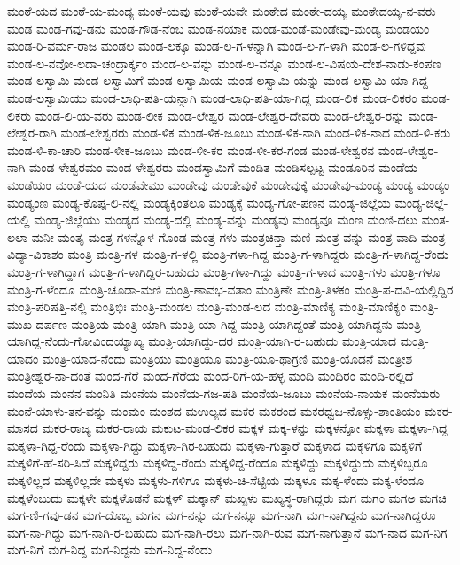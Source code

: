 ಮಂಠೆ-ಯದ
ಮಂಠೆ-ಯ-ಮಂಡ್ಯ
ಮಂಠೆ-ಯವು
ಮಂಠೆ-ಯವೇ
ಮಂಠೇದ
ಮಂಠೇ-ದಯ್ಯ
ಮಂಠೇದಯ್ಯ-ನ-ವರು
ಮಂಡ
ಮಂಡ-ಗವು-ಡನು
ಮಂಡ-ಗೌಡ-ನೆಂಬ
ಮಂಡ-ನಯಾಕ
ಮಂಡ-ಮಂಡೆ-ಮಂಡೇವು-ಮಂಡ್ಯ
ಮಂಡಯಂ
ಮಂಡ-ರಿ-ವರ್ಮ-ರಾಜ
ಮಂಡಲ
ಮಂಡ-ಲಕ್ಕೂ
ಮಂಡ-ಲ-ಗ-ಳನ್ನಾಗಿ
ಮಂಡ-ಲ-ಗ-ಳಾಗಿ
ಮಂಡ-ಲ-ಗಳಿದ್ದವು
ಮಂಡ-ಲ-ನವೋ-ಲದಾ-ಚಂದ್ರಾರ್ಕ್ಕಂ
ಮಂಡ-ಲ-ವನ್ನು
ಮಂಡ-ಲ-ವನ್ನೂ
ಮಂಡ-ಲ-ವಿಷಯ-ದೇಶ-ನಾಡು-ಕಂಪಣ
ಮಂಡ-ಲಸ್ವಾಮಿ
ಮಂಡ-ಲಸ್ವಾಮಿಗೆ
ಮಂಡ-ಲಸ್ವಾಮಿಯ
ಮಂಡ-ಲಸ್ವಾಮಿ-ಯನ್ನು
ಮಂಡ-ಲಸ್ವಾಮಿ-ಯಾ-ಗಿದ್ದ
ಮಂಡ-ಲಸ್ವಾಮಿಯು
ಮಂಡ-ಲಾಧಿ-ಪತಿ-ಯನ್ನಾಗಿ
ಮಂಡ-ಲಾಧಿ-ಪತಿ-ಯಾ-ಗಿದ್ದ
ಮಂಡ-ಲಿಕ
ಮಂಡ-ಲಿಕರಂ
ಮಂಡ-ಲಿಕರು
ಮಂಡ-ಲಿ-ಯ-ವರು
ಮಂಡ-ಲೀಕ
ಮಂಡ-ಲೇಶ್ವರ
ಮಂಡ-ಲೇಶ್ವರ-ದೇವರು
ಮಂಡ-ಲೇಶ್ವರ-ರನ್ನು
ಮಂಡ-ಲೇಶ್ವರ-ರಾಗಿ
ಮಂಡ-ಲೇಶ್ವರರು
ಮಂಡ-ಳಿಕ
ಮಂಡ-ಳಿಕ-ಜೂಬು
ಮಂಡ-ಳಿಕ-ನಾಗಿ
ಮಂಡ-ಳಿಕ-ನಾದ
ಮಂಡ-ಳಿ-ಕರು
ಮಂಡ-ಳಿ-ಕಾ-ಚಾರಿ
ಮಂಡ-ಳೀಕ-ಜೂಬು
ಮಂಡ-ಳೀ-ಕರ
ಮಂಡ-ಳೀ-ಕರ-ಗಂಡ
ಮಂಡ-ಳೇಶ್ವರನ
ಮಂಡ-ಳೇಶ್ವರ-ನಾಗಿ
ಮಂಡ-ಳೇಶ್ವರಮಂ
ಮಂಡ-ಳೇಶ್ವರರು
ಮಂಡಸ್ವಾಮಿಗೆ
ಮಂಡಿತ
ಮಂಡಿಸಲ್ಪಟ್ಟ
ಮಂಡೂರಿನ
ಮಂಡೆಯ
ಮಂಡೆಯಂ
ಮಂಡೆ-ಯದ
ಮಂಡೆವೇಮು
ಮಂಡೇವು
ಮಂಡೇವುಕೆ
ಮಂಡೇವುಕ್ಕೆ
ಮಂಡೇವು-ಮಂಡ್ಯ
ಮಂಡ್ಯ
ಮಂಡ್ಯಂ
ಮಂಡ್ಯಂಣ
ಮಂಡ್ಯ-ಕೊಪ್ಪ-ಲಿ-ನಲ್ಲಿ
ಮಂಡ್ಯಕ್ಕಿಂತಲೂ
ಮಂಡ್ಯಕ್ಕೆ
ಮಂಡ್ಯ-ಗೋ-ಪಣನ
ಮಂಡ್ಯ-ಜಿಲ್ಲೆಯ
ಮಂಡ್ಯ-ಜಿಲ್ಲೆ-ಯಲ್ಲಿ
ಮಂಡ್ಯ-ಜಿಲ್ಲೆಯು
ಮಂಡ್ಯದ
ಮಂಡ್ಯ-ದಲ್ಲಿ
ಮಂಡ್ಯ-ವನ್ನು
ಮಂಡ್ಯವು
ಮಂಡ್ಯವೂ
ಮಂಣ
ಮಂಣಿ-ದಲು
ಮಂತ-ಲಲಾ-ಮನೀ
ಮಂತೃ
ಮಂತ್ರ-ಗಳನ್ನೊಳ-ಗೊಂಡ
ಮಂತ್ರ-ಗಳು
ಮಂತ್ರಚಿನ್ತಾ-ಮಣಿ
ಮಂತ್ರ-ವನ್ನು
ಮಂತ್ರ-ವಾದಿ
ಮಂತ್ರ-ವಿದ್ಯಾ-ವಿಕಾಶಂ
ಮಂತ್ರಿ
ಮಂತ್ರಿ-ಗಳ
ಮಂತ್ರಿ-ಗ-ಳಲ್ಲಿ
ಮಂತ್ರಿ-ಗಳಾ-ಗಿದ್ದ
ಮಂತ್ರಿ-ಗ-ಳಾಗಿದ್ದರು
ಮಂತ್ರಿ-ಗ-ಳಾಗಿದ್ದ-ರೆಂದು
ಮಂತ್ರಿ-ಗ-ಳಾಗಿದ್ದಾಗ
ಮಂತ್ರಿ-ಗ-ಳಾಗಿದ್ದಿರ-ಬಹುದು
ಮಂತ್ರಿ-ಗಳಾ-ಗಿದ್ದು
ಮಂತ್ರಿ-ಗ-ಳಾದ
ಮಂತ್ರಿ-ಗಳು
ಮಂತ್ರಿ-ಗಳೂ
ಮಂತ್ರಿ-ಗ-ಳೆಂದೂ
ಮಂತ್ರಿ-ಚೂಡಾ-ಮಣಿ
ಮಂತ್ರಿ-ಣಾವಭ-ವತಾಂ
ಮಂತ್ರಿಣೇ
ಮಂತ್ರಿ-ತಿಳಕಂ
ಮಂತ್ರಿ-ಪ-ದವಿ-ಯಲ್ಲಿದ್ದಿರ
ಮಂತ್ರಿ-ಪರಿಷತ್ತಿ-ನಲ್ಲಿ
ಮಂತ್ರಿಭಿಃ
ಮಂತ್ರಿ-ಮಂಡಲ
ಮಂತ್ರಿ-ಮಂಡ-ಲದ
ಮಂತ್ರಿ-ಮಾಣಿಕ್ಯ
ಮಂತ್ರಿ-ಮಾಣಿಕ್ಯಂ
ಮಂತ್ರಿ-ಮುಖ-ದರ್ಪಣ
ಮಂತ್ರಿಯ
ಮಂತ್ರಿ-ಯಾಗಿ
ಮಂತ್ರಿ-ಯಾ-ಗಿದ್ದ
ಮಂತ್ರಿ-ಯಾಗಿದ್ದಂತೆ
ಮಂತ್ರಿ-ಯಾಗಿದ್ದನು
ಮಂತ್ರಿ-ಯಾಗಿದ್ದ-ನೆಂದು-ಗೋವಿಂದಯ್ಯಾಖ್ಯ
ಮಂತ್ರಿ-ಯಾಗಿದ್ದು-ದರ
ಮಂತ್ರಿ-ಯಾಗಿ-ರ-ಬಹುದು
ಮಂತ್ರಿ-ಯಾದ
ಮಂತ್ರಿ-ಯಾದಂ
ಮಂತ್ರಿ-ಯಾದ-ನೆಂದು
ಮಂತ್ರಿಯು
ಮಂತ್ರಿಯೂ
ಮಂತ್ರಿ-ಯೂ-ಥಾಗ್ರಣಿ
ಮಂತ್ರಿ-ಯೊಡನೆ
ಮಂತ್ರೀಶ
ಮಂತ್ರೀಶ್ವರ-ನಾ-ದಂತೆ
ಮಂದ-ಗೆರೆ
ಮಂದ-ಗೆರೆಯ
ಮಂದ-ರಿಗೆ-ಯ-ಹಳ್ಳ
ಮಂದಿ
ಮಂದಿರಂ
ಮಂದಿ-ರಲ್ಲಿದೆ
ಮಂದೆಯ
ಮಂನನ
ಮಂನಿತಿ
ಮಂನೆಯ
ಮಂನೆಯ-ಗಜ-ಪತಿ
ಮಂನೆಯ-ಜೂಬು
ಮಂನೆಯ-ನಾಯಕ
ಮಂನೆಯರು
ಮಂನೆ-ಯಾಳು-ತನ-ವನ್ನು
ಮಂಮಂ
ಮಂಶದ
ಮಉಲ್ಯದ
ಮಕರ
ಮಕರಂದ
ಮಕರಧ್ವಜ-ನೊಳ್ಸು-ಶಾಂತಿಯಂ
ಮಕರ-ಮಾಸದ
ಮಕರ-ರಾಜ್ಯ
ಮಕರ-ರಾಯ
ಮಕುಟ-ಮಂಡ-ಲಿಕರ
ಮಕ್ಕಳ
ಮಕ್ಕ-ಳನ್ನು
ಮಕ್ಕಳನ್ನೋ
ಮಕ್ಕಳಾ
ಮಕ್ಕಳಾ-ಗಿದ್ದ
ಮಕ್ಕಳಾ-ಗಿದ್ದ-ರೆಂದು
ಮಕ್ಕಳಾ-ಗಿದ್ದು
ಮಕ್ಕಳಾ-ಗಿರ-ಬಹುದು
ಮಕ್ಕಳಾ-ಗುತ್ತಾರೆ
ಮಕ್ಕಳಾದ
ಮಕ್ಕಳಿಗೂ
ಮಕ್ಕಳಿಗೆ
ಮಕ್ಕಳಿಗೆ-ಹೆ-ಸರಿ-ಸಿದೆ
ಮಕ್ಕಳಿದ್ದರು
ಮಕ್ಕಳಿದ್ದ-ರೆಂದು
ಮಕ್ಕಳಿದ್ದ-ರೆಂದೂ
ಮಕ್ಕಳಿದ್ದು
ಮಕ್ಕಳಿದ್ದುದು
ಮಕ್ಕಳಿಬ್ಬರೂ
ಮಕ್ಕಳಿಲ್ಲದ
ಮಕ್ಕಳಿಲ್ಲದೇ
ಮಕ್ಕಳು
ಮಕ್ಕಳು-ಗಳಿಗೂ
ಮಕ್ಕಳು-ಚಿ-ಸೆಟ್ಟಿಯ
ಮಕ್ಕಳೂ
ಮಕ್ಕ-ಳೆಂದು
ಮಕ್ಕ-ಳೆಂದೂ
ಮಕ್ಕಳೆಂಬುದು
ಮಕ್ಕಳೇ
ಮಕ್ಕಳೊಡನೆ
ಮಕ್ಕಳ್
ಮಕ್ಕಾನ್
ಮಖ್ಖಳು
ಮಖ್ಯಸ್ಥ-ರಾಗಿದ್ದರು
ಮಗ
ಮಗಂ
ಮಗಅ
ಮಗಚಿ
ಮಗ-ಣಿ-ಗವು-ಡನ
ಮಗ-ದೊಬ್ಬ
ಮಗನ
ಮಗ-ನನ್ನು
ಮಗ-ನನ್ನೂ
ಮಗ-ನಾಗಿ
ಮಗ-ನಾಗಿದ್ದನು
ಮಗ-ನಾಗಿದ್ದರೂ
ಮಗ-ನಾ-ಗಿದ್ದು
ಮಗ-ನಾಗಿ-ರ-ಬಹುದು
ಮಗ-ನಾಗಿ-ರಲು
ಮಗ-ನಾಗಿ-ರುವ
ಮಗ-ನಾಗುತ್ತಾನೆ
ಮಗ-ನಾದ
ಮಗ-ನಿಗ
ಮಗ-ನಿಗೆ
ಮಗ-ನಿದ್ದ
ಮಗ-ನಿದ್ದನು
ಮಗ-ನಿದ್ದ-ನೆಂದು
